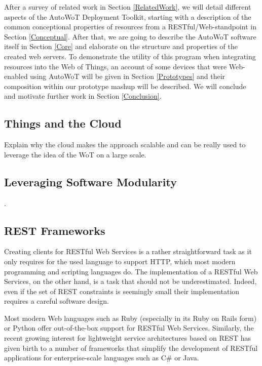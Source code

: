 After a survey of related work in Section \ref{RelatedWork}, we will detail different aspects of the AutoWoT Deployment Toolkit, starting with a description of the common conceptional properties of resources from a RESTful/Web-standpoint in Section \ref{Conceptual}. After that, we are going to describe the AutoWoT software itself in Section \ref{Core} and elaborate on the structure and properties of the created web servers. To demonstrate the utility of this program when integrating resources into the Web of Things, an account of some devices that were Web-enabled using AutoWoT will be given in Section \ref{Prototypes} and their composition within our prototype mashup will be described. We will conclude and motivate further work in Section \ref{Conclusion}.

\subsection{Things and the Cloud}
Explain why the cloud makes the approach scalable and can be really used to leverage the idea of the WoT on a large scale.

\subsection{Leveraging Software Modularity}
.

\subsection{REST Frameworks}
Creating clients for RESTful Web Services is a rather straightforward task as it only requires for the used language to support HTTP, which most modern programming and scripting languages do. The implementation of a RESTful Web Services, on the other hand, is a task that should not be underestimated. Indeed, even if the set of REST constraints is seemingly small their implementation requires a careful software design.

Most modern Web languages such as Ruby (especially in its Ruby on Rails form) or Python offer out-of-the-box support for RESTful Web Services. Similarly, the recent growing interest for lightweight service architectures based on REST has given birth to a number of frameworks that simplify the development of RESTful applications for enterprise-scale languages such as C\# or Java.


